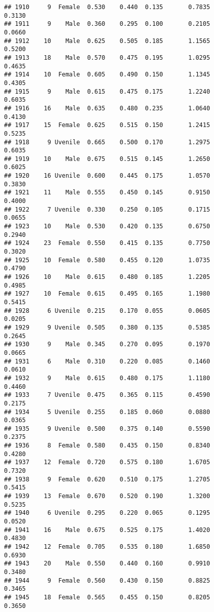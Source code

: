 \documentclass[
]{article}
\begin{document}
\begin{verbatim}
## 1910     9  Female  0.530    0.440  0.135       0.7835         0.3130
## 1911     9    Male  0.360    0.295  0.100       0.2105         0.0660
## 1912    10    Male  0.625    0.505  0.185       1.1565         0.5200
## 1913    18    Male  0.570    0.475  0.195       1.0295         0.4635
## 1914    10  Female  0.605    0.490  0.150       1.1345         0.4305
## 1915     9    Male  0.615    0.475  0.175       1.2240         0.6035
## 1916    16    Male  0.635    0.480  0.235       1.0640         0.4130
## 1917    15  Female  0.625    0.515  0.150       1.2415         0.5235
## 1918     9 Uvenile  0.665    0.500  0.170       1.2975         0.6035
## 1919    10    Male  0.675    0.515  0.145       1.2650         0.6025
## 1920    16 Uvenile  0.600    0.445  0.175       1.0570         0.3830
## 1921    11    Male  0.555    0.450  0.145       0.9150         0.4000
## 1922     7 Uvenile  0.330    0.250  0.105       0.1715         0.0655
## 1923    10    Male  0.530    0.420  0.135       0.6750         0.2940
## 1924    23  Female  0.550    0.415  0.135       0.7750         0.3020
## 1925    10  Female  0.580    0.455  0.120       1.0735         0.4790
## 1926    10    Male  0.615    0.480  0.185       1.2205         0.4985
## 1927    10  Female  0.615    0.495  0.165       1.1980         0.5415
## 1928     6 Uvenile  0.215    0.170  0.055       0.0605         0.0205
## 1929     9 Uvenile  0.505    0.380  0.135       0.5385         0.2645
## 1930     9    Male  0.345    0.270  0.095       0.1970         0.0665
## 1931     6    Male  0.310    0.220  0.085       0.1460         0.0610
## 1932     9    Male  0.615    0.480  0.175       1.1180         0.4460
## 1933     7 Uvenile  0.475    0.365  0.115       0.4590         0.2175
## 1934     5 Uvenile  0.255    0.185  0.060       0.0880         0.0365
## 1935     9 Uvenile  0.500    0.375  0.140       0.5590         0.2375
## 1936     8  Female  0.580    0.435  0.150       0.8340         0.4280
## 1937    12  Female  0.720    0.575  0.180       1.6705         0.7320
## 1938     9  Female  0.620    0.510  0.175       1.2705         0.5415
## 1939    13  Female  0.670    0.520  0.190       1.3200         0.5235
## 1940     6 Uvenile  0.295    0.220  0.065       0.1295         0.0520
## 1941    16    Male  0.675    0.525  0.175       1.4020         0.4830
## 1942    12  Female  0.705    0.535  0.180       1.6850         0.6930
## 1943    20    Male  0.550    0.440  0.160       0.9910         0.3480
## 1944     9  Female  0.560    0.430  0.150       0.8825         0.3465
## 1945    18  Female  0.565    0.455  0.150       0.8205         0.3650

\end{verbatim}
\end{document}
